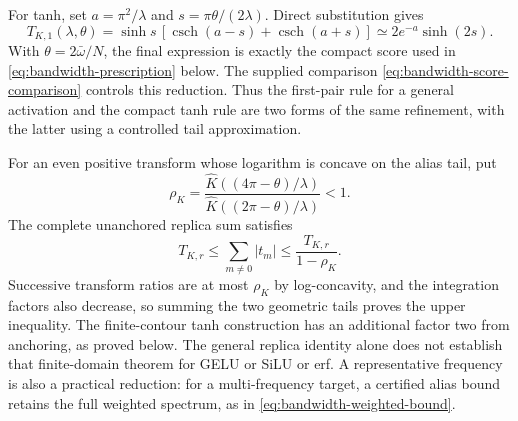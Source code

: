 \documentclass[11pt]{article}
\begin{document}
For tanh, set $a=\pi^2/\lambda$ and
$s=\pi\theta/(2\lambda)$. Direct substitution gives
\begin{equation}
 T_{K,1}(\lambda,\theta)
 =\sinh s\,[\operatorname{csch}(a-s)+\operatorname{csch}(a+s)]
 \simeq2e^{-a}\sinh(2s).
 \label{eq:bw-tanh-reduction}
\end{equation}
With $\theta=2\bar\omega/N$, the final expression is exactly the compact
score used in \eqref{eq:bandwidth-prescription} below. The supplied
comparison \eqref{eq:bandwidth-score-comparison} controls this reduction.
Thus the first-pair rule for a general activation and the compact tanh rule
are two forms of the same refinement, with the latter using a controlled
tail approximation.

For an even positive transform whose logarithm is concave on the alias
tail, put
\[
 \rho_K=
 \frac{\widehat K((4\pi-\theta)/\lambda)}
      {\widehat K((2\pi-\theta)/\lambda)}<1.
\]
The complete unanchored replica sum satisfies
\begin{equation}
 T_{K,r}\le\sum_{m\ne0}|t_m|
 \le\frac{T_{K,r}}{1-\rho_K}.
 \label{eq:bw-tail-control}
\end{equation}
Successive transform ratios are at most $\rho_K$ by log-concavity, and the
integration factors also decrease, so summing the two geometric tails
proves the upper inequality. The finite-contour tanh construction has an
additional factor two from anchoring, as proved below. The general replica
identity alone does not establish that finite-domain theorem for GELU or
SiLU or erf. A representative frequency is also a practical reduction: for a
multi-frequency target, a certified alias bound retains the full weighted
spectrum, as in \eqref{eq:bandwidth-weighted-bound}.
\end{document}
